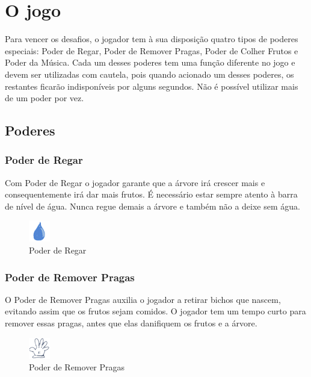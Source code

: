 \documentclass[12pt]{article}
\begin{document}
\section{O jogo}

 Para vencer os desafios, o jogador tem \`a sua disposi\c c\~ao quatro tipos de poderes especiais: Poder de Regar,
 Poder de Remover Pragas, Poder de Colher Frutos e Poder da M\'usica. Cada um desses poderes tem uma fun\c c\~ao
 diferente no jogo e devem ser utilizadas com cautela, pois quando acionado um desses poderes, os restantes ficar\~ao
 indispon\'iveis por alguns segundos. N\~ao \'e poss\'ivel utilizar mais de um poder por vez.
 
 \subsection{Poderes}
 \subsubsection{Poder de Regar} 
 Com Poder de Regar o jogador garante que a \'arvore ir\'a crescer mais e consequentemente ir\'a
 dar mais frutos. \'E necess\'ario estar sempre atento \`a barra de n\'ivel de \'agua. Nunca regue demais a
 \'arvore e tamb\'em n\~ao a deixe sem \'agua.
 
	\begin{figure}[ht!]
	\begin{center}
		\includegraphics[scale=1.15]{img/icone_gota.png}
		\footnotesize \caption{Poder de Regar }
	\end{center}
	\end{figure}	
  
 \subsubsection{Poder de Remover Pragas}
 O Poder de Remover Pragas auxilia o jogador a retirar bichos que nascem, evitando assim
 que os frutos sejam comidos. O jogador tem um tempo curto para remover essas pragas, antes que
 elas danifiquem os frutos e a \'arvore.

	\begin{figure}[ht!]
	\begin{center}
		\includegraphics[scale=1.15]{img/icone_luva.png}
		\footnotesize \caption{Poder de Remover Pragas }
	\end{center}
	\end{figure}	
 
\end{document}
